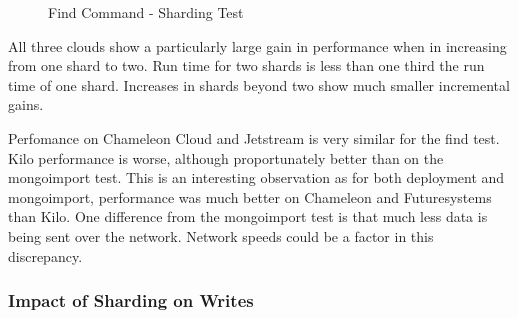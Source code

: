 \documentclass[sigconf]{acmart}
\begin{document}
\begin{figure}[htbp]
\centering
{}
\caption{Find Command - Sharding Test}
\label{fig:shard-find}
\end{figure}


All three clouds show a particularly large gain in performance when in
increasing from one shard to two.  Run time for two shards is less
than one third the run time of one shard.  Increases in shards beyond
two show much smaller incremental gains.

Perfomance on Chameleon Cloud and Jetstream is very similar for the
find test.  Kilo performance is worse, although proportunately better
than on the mongoimport test.  This is an interesting observation as
for both deployment and mongoimport, performance was much better on
Chameleon and Futuresystems than Kilo.  One difference from the
mongoimport test is that much less data is being sent over the
network.  Network speeds could be a factor in this discrepancy.


\subsubsection{Impact of Sharding on Writes}
\end{document}
